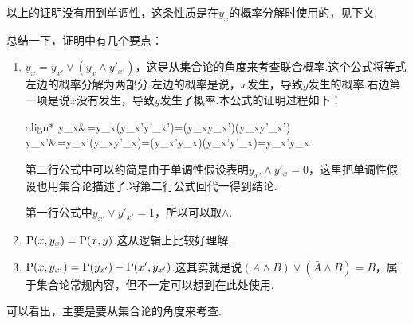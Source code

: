 以上的证明没有用到单调性，这条性质是在$y_x$的概率分解时使用的，见下文.

总结一下，证明中有几个要点：
\begin{enumerate}
	\item $y_x=y_{x'}\vee (y_x \wedge y'_{x'})$，这是从集合论的角度来考查联合概率.这个公式将等式左边的概率分解为两部分.左边的概率是说，$x$发生，导致$y$发生的概率.右边第一项是说$x$没有发生，导致$y$发生了概率.本公式的证明过程如下：
	\begin{empheq}{align*}
		y_x&=y_x\wedge (y_{x'}\vee y'_{x'})=(y_x\wedge y_{x'})\vee (y_x\wedge y'_{x'})\\
		y_{x'}&=y_{x'}\wedge (y_x\vee y'_x)=(y_{x'}\wedge y_x)\vee (y_{x'}\wedge y'_x)=y_{x'}\wedge y_x\\
	\end{empheq}
	
	第二行公式中可以约简是由于单调性假设表明$y_{x'}\wedge y'_{x}=0$，这里把单调性假设也用集合论描述了.将第二行公式回代一得到结论.
	
	第一行公式中$y_{x'}\vee y'_{x'}=1$，所以可以取$\wedge$.
	
	\item $\operatorname{P}(x,y_x)=\operatorname{P}(x,y)$.这从逻辑上比较好理解.
	\item $\operatorname{P}(x,y_{x'})=\operatorname{P}(y_{x'})-\operatorname{P}(x',y_{x'})$.这其实就是说$(A\wedge B)\vee (\bar{A}\wedge B)=B$，属于集合论常规内容，但不一定可以想到在此处使用.
\end{enumerate}

可以看出，主要是要从集合论的角度来考查.

